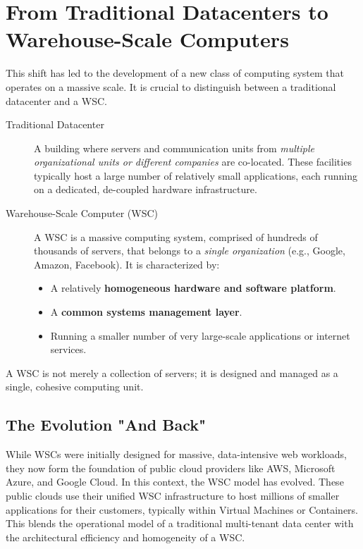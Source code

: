 \section{From Traditional Datacenters to Warehouse-Scale Computers}
This shift has led to the development of a new class of computing system that operates on a massive scale. It is crucial to distinguish between a traditional datacenter and a WSC.

\begin{description}
    \item[Traditional Datacenter] A building where servers and communication units from \textit{multiple organizational units or different companies} are co-located. These facilities typically host a large number of relatively small applications, each running on a dedicated, de-coupled hardware infrastructure.
    \item[Warehouse-Scale Computer (WSC)] A WSC is a massive computing system, comprised of hundreds of thousands of servers, that belongs to a \textit{single organization} (e.g., Google, Amazon, Facebook). It is characterized by:
    \begin{itemize}
        \item A relatively \textbf{homogeneous hardware and software platform}.
        \item A \textbf{common systems management layer}.
        \item Running a smaller number of very large-scale applications or internet services.
    \end{itemize}
\end{description}
A WSC is not merely a collection of servers; it is designed and managed as a single, cohesive computing unit.

\subsection{The Evolution "And Back"}
While WSCs were initially designed for massive, data-intensive web workloads, they now form the foundation of public cloud providers like AWS, Microsoft Azure, and Google Cloud. In this context, the WSC model has evolved. These public clouds use their unified WSC infrastructure to host millions of smaller applications for their customers, typically within Virtual Machines or Containers. This blends the operational model of a traditional multi-tenant data center with the architectural efficiency and homogeneity of a WSC.

